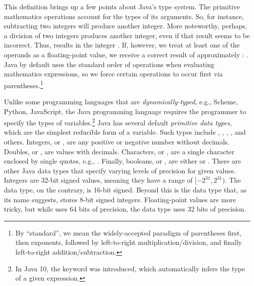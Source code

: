 This definition brings up a few points about Java's type system. The primitive mathematics operations account for the types of its arguments. So, for instance, subtracting two integers will produce another integer. More noteworthy, perhaps, a division of two integers produces another integer, even if that result seems to be incorrect. Thus,  results in the integer . If, however, we treat at least one of the operands as a floating-point value, we receive a correct result of approximately : . Java by default uses the standard order of operations when evaluating mathematics expressions, so we force certain operations to occur first via parentheses.\footnote{By ``standard'', we mean the widely-accepted paradigm of parentheses first, then exponents, followed by left-to-right multiplication/division, and finally left-to-right addition/subtraction.}

Unlike some programming languages that are \textit{dynamically-typed}, e.g., Scheme, Python, JavaScript, the Java programming language requires the programmer to specify the types of variables.\footnote{In Java 10, the  keyword was introduced, which automatically infers the type of a given expression.} Java has several default \textit{primitive data types}, which are the simplest reducible form of a variable. Such types include , , , , and others. Integers, or , are any positive or negative number without decimals. Doubles, or , are values with decimals. Characters, or , are a single character enclosed by single quotes, e.g., . Finally, booleans, or , are either  or . There are other Java data types that specify varying levels of precision for given values. Integers are 32-bit signed values, meaning they have a range of $[-2^{31}, 2^{31})$. The  data type, on the contrary, is 16-bit signed. Beyond this is the  data type that, as its name suggests, stores 8-bit signed integers. Floating-point values are more tricky, but while  uses 64 bits of precision, the  data type uses 32 bits of precision.


